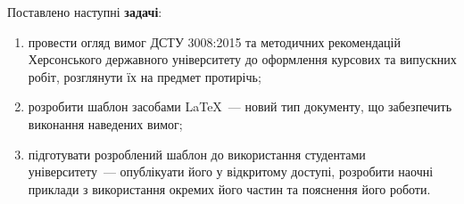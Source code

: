 Поставлено наступні \textbf{задачі}: 
\begin{enumerate}
\item провести огляд вимог ДСТУ 3008:2015 та методичних рекомендацій Херсонського державного університету до оформлення курсових та випускних робіт, розглянути їх на предмет протирічь;
\item розробити шаблон засобами \LaTeX{}~--- новий тип документу, що забезпечить виконання наведених вимог;
\item підготувати розроблений шаблон до використання студентами університету~--- опублікуати його у відкритому доступі, розробити наочні приклади з використання окремих його частин та пояснення його роботи.
\end{enumerate}
